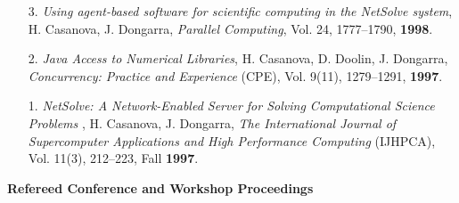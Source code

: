 \begin{enumerate}
\item[3.]
{\it Using agent-based software for scientific computing in the NetSolve
system}, H. Casanova, J. Dongarra, \emph{Parallel Computing}, Vol. 24,
1777--1790, {\bf 1998}.

\item[2.]
{\it Java Access to Numerical Libraries}, H. Casanova, D. Doolin,
J. Dongarra, \emph{Concurrency: Practice and Experience} (CPE), Vol. 9(11),
1279--1291, {\bf 1997}.

\item[1.]
{\it NetSolve: A Network-Enabled Server for Solving Computational
Science Problems }, H. Casanova, J. Dongarra, {\em The International
Journal of Supercomputer Applications and High Performance Computing}
(IJHPCA), Vol. 11(3), 212--223, Fall {\bf 1997}. 

\end{enumerate}

\noindent
{\bf Refereed Conference and Workshop Proceedings}

